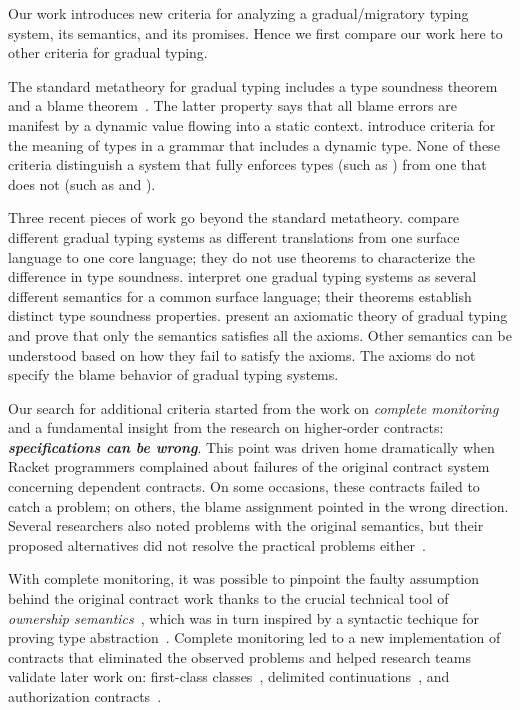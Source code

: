 
Our work introduces new criteria for analyzing a gradual/migratory typing
 system, its semantics, and its promises. Hence we first compare our
 work here to other criteria for gradual typing.

The standard metatheory for gradual typing includes a type soundness theorem
 and a blame theorem~\cite{tf-dls-2006,wf-esop-2009,w-snapl-2015}.
The latter property says that all blame errors are manifest by
 a dynamic value flowing into a static context.
\citet{svcb-snapl-2015} introduce criteria for the meaning of types in a
 grammar that includes a dynamic type.  None of these criteria distinguish a
 system that fully enforces types (such as \Nname{}) from one that does not
 (such as \Aname{} and \Tname{}).

Three recent pieces of work go beyond the standard metatheory.
 \citet{clzv-ecoop-2018} compare different gradual typing systems as
 different translations from one surface language to one core language;
 they do not use theorems to characterize the difference in type soundness.
 \citet{gf-icfp-2018} interpret one gradual typing systems as several
 different semantics for a common surface language; their theorems
 establish distinct type soundness properties.  \citet{nla-popl-2019}
 present an axiomatic theory of gradual typing and prove that only the
 \Nname{} semantics satisfies all the axioms. Other semantics can be understood
 based on how they fail to satisfy the axioms.  The axioms do not specify
 the blame behavior of gradual typing systems.

Our search for additional criteria started from the work on {\em
 complete monitoring\/}~\cite{dtf-esop-2012} and a fundamental insight from
 the research on higher-order contracts:
%
\textbf{\emph{specifications can be wrong}}.
% 
This point was driven home dramatically when Racket programmers complained
 about failures of the original contract system~\cite{ff-icfp-2002}
 concerning dependent contracts. On some occasions, these contracts failed to
 catch a problem; on others, the blame assignment pointed in the
 wrong direction. Several researchers also noted problems
 with the original semantics, but their proposed alternatives did not
 resolve the practical problems either~\cite{bm-jfp-2006,hjl-flops-2006,gpw-jfp-2012}.

With complete monitoring, it was possible to pinpoint the faulty assumption
behind the original contract work thanks to the crucial technical tool of
\emph{ownership semantics}\/~\cite{dfff-popl-2011}, which was in turn
inspired by a syntactic techique for proving type abstraction~\cite{gmz-toplas-2000}.
Complete monitoring led to a new implementation of contracts that
eliminated the observed problems and helped research teams validate later work
on:
 first-class classes~\cite{tsdtf-oopsla-2012},
 delimited continuations~\cite{tst-esop-2013},
 and authorization contracts~\cite{mdffc-oopsla-2016}.

